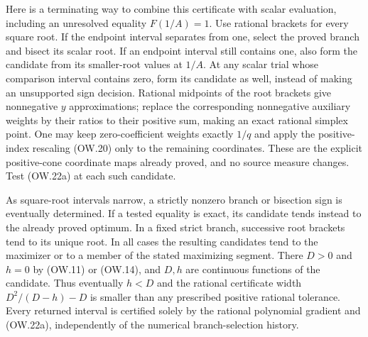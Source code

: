 \documentclass[11pt]{article}
\begin{document}
Here is a terminating way to combine this certificate with scalar
evaluation, including an unresolved equality $F(1/A)=1$.
Use rational brackets for every square root. If the endpoint interval
separates from one, select the proved branch and bisect its scalar
root. If an endpoint interval still contains one, also form the
candidate from its smaller-root values at $1/A$. At any scalar
trial whose comparison interval contains zero, form its candidate
as well, instead of making an unsupported sign decision. Rational
midpoints of the root brackets give nonnegative $y$ approximations;
replace the corresponding nonnegative auxiliary weights by their
ratios to their positive sum, making an exact rational simplex
point. One may keep zero-coefficient weights exactly $1/q$ and
apply the positive-index rescaling (OW.20) only to the remaining
coordinates. These are the explicit positive-cone coordinate maps
already proved, and no source measure changes. Test (OW.22a) at
each such candidate.

As square-root intervals narrow, a strictly nonzero branch or
bisection sign is eventually determined. If a tested equality is
exact, its candidate tends instead to the already proved optimum.
In a fixed strict branch, successive root brackets tend to its
unique root. In all cases the resulting candidates tend to the
maximizer or to a member of the stated maximizing segment.
There $D>0$ and $h=0$ by (OW.11) or (OW.14), and $D,h$ are
continuous functions of the candidate. Thus eventually $h<D$ and
the rational certificate width $D^2/(D-h)-D$ is smaller than any
prescribed positive rational tolerance. Every returned interval is
certified solely by the rational polynomial gradient and (OW.22a),
independently of the numerical branch-selection history.
\end{document}

